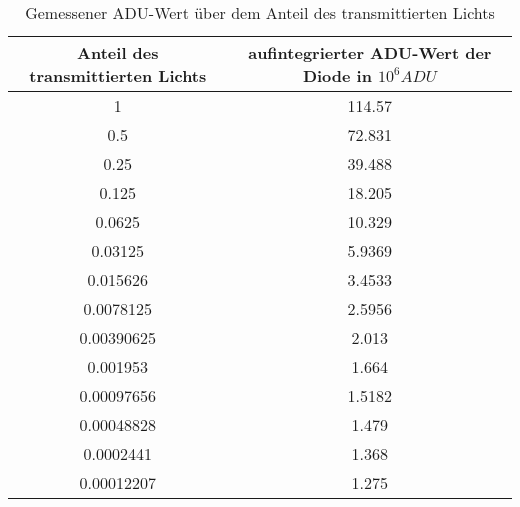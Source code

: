 \begin{table}[h!]
\centering
\begin{tabular}{c c}
Anteil des transmittierten Lichts & aufintegrierter ADU-Wert der Diode in $10^6 ADU$ \\
\hline
1	&114.57\\
0.5	&72.831\\
0.25	&39.488\\
0.125	&18.205\\
0.0625	&10.329\\
0.03125	&5.9369\\
0.015626	&3.4533\\
0.0078125	&2.5956\\
0.00390625	&2.013\\
0.001953	&1.664\\
0.00097656	&1.5182\\
0.00048828	&1.479\\
0.0002441	&1.368\\
0.00012207	&1.275 \\
\end{tabular}
\caption{Gemessener ADU-Wert über dem Anteil des transmittierten Lichts}
\label{tbl:adu_int}
\end{table}